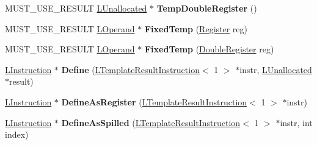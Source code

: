 \begin{DoxyCompactItemize}
\item 
M\+U\+S\+T\+\_\+\+U\+S\+E\+\_\+\+R\+E\+S\+U\+LT \hyperlink{classv8_1_1internal_1_1_l_unallocated}{L\+Unallocated} $\ast$ {\bfseries Temp\+Double\+Register} ()\hypertarget{classv8_1_1internal_1_1_l_chunk_builder_a524f9d3d8fb435bb5c2232a108423493}{}\label{classv8_1_1internal_1_1_l_chunk_builder_a524f9d3d8fb435bb5c2232a108423493}

\item 
M\+U\+S\+T\+\_\+\+U\+S\+E\+\_\+\+R\+E\+S\+U\+LT \hyperlink{classv8_1_1internal_1_1_l_operand}{L\+Operand} $\ast$ {\bfseries Fixed\+Temp} (\hyperlink{structv8_1_1internal_1_1_register}{Register} reg)\hypertarget{classv8_1_1internal_1_1_l_chunk_builder_a0e9a78fbc1b87c8a44c721e93143b26e}{}\label{classv8_1_1internal_1_1_l_chunk_builder_a0e9a78fbc1b87c8a44c721e93143b26e}

\item 
M\+U\+S\+T\+\_\+\+U\+S\+E\+\_\+\+R\+E\+S\+U\+LT \hyperlink{classv8_1_1internal_1_1_l_operand}{L\+Operand} $\ast$ {\bfseries Fixed\+Temp} (\hyperlink{structv8_1_1internal_1_1_double_register}{Double\+Register} reg)\hypertarget{classv8_1_1internal_1_1_l_chunk_builder_adab20084d9ddf5e0e2c369ada7049b2e}{}\label{classv8_1_1internal_1_1_l_chunk_builder_adab20084d9ddf5e0e2c369ada7049b2e}

\item 
\hyperlink{classv8_1_1internal_1_1_l_instruction}{L\+Instruction} $\ast$ {\bfseries Define} (\hyperlink{classv8_1_1internal_1_1_l_template_result_instruction}{L\+Template\+Result\+Instruction}$<$ 1 $>$ $\ast$instr, \hyperlink{classv8_1_1internal_1_1_l_unallocated}{L\+Unallocated} $\ast$result)\hypertarget{classv8_1_1internal_1_1_l_chunk_builder_afd009a30c72fe37dd1b35d4241854ca0}{}\label{classv8_1_1internal_1_1_l_chunk_builder_afd009a30c72fe37dd1b35d4241854ca0}

\item 
\hyperlink{classv8_1_1internal_1_1_l_instruction}{L\+Instruction} $\ast$ {\bfseries Define\+As\+Register} (\hyperlink{classv8_1_1internal_1_1_l_template_result_instruction}{L\+Template\+Result\+Instruction}$<$ 1 $>$ $\ast$instr)\hypertarget{classv8_1_1internal_1_1_l_chunk_builder_af4f9a5078553b1f743899df249a25b31}{}\label{classv8_1_1internal_1_1_l_chunk_builder_af4f9a5078553b1f743899df249a25b31}

\item 
\hyperlink{classv8_1_1internal_1_1_l_instruction}{L\+Instruction} $\ast$ {\bfseries Define\+As\+Spilled} (\hyperlink{classv8_1_1internal_1_1_l_template_result_instruction}{L\+Template\+Result\+Instruction}$<$ 1 $>$ $\ast$instr, int index)\hypertarget{classv8_1_1internal_1_1_l_chunk_builder_a4e42c6b4bb935cc879f078e349ee6a1d}{}\label{classv8_1_1internal_1_1_l_chunk_builder_a4e42c6b4bb935cc879f078e349ee6a1d}


\end{DoxyCompactItemize}
